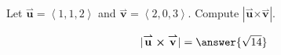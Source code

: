 \documentclass{ximera}
\author{Gregory Hartman \and Matthew Carr}
\begin{document}
\begin{exercise}

Let $\overset{\boldsymbol{\rightharpoonup}}{\mathbf{u}} = \left< 1,1,2\right>$ and $\overset{\boldsymbol{\rightharpoonup}}{\mathbf{v}} = \left< 2,0,3 \right>$. Compute $|\overset{\boldsymbol{\rightharpoonup}}{\mathbf{u}} \boldsymbol\times \overset{\boldsymbol{\rightharpoonup}}{\mathbf{v}}|$.

\begin{prompt}
\[
|\overset{\boldsymbol{\rightharpoonup}}{\mathbf{u}} \boldsymbol\times \overset{\boldsymbol{\rightharpoonup}}{\mathbf{v}}|=\answer{\sqrt{14}}
\]
\end{prompt}


\end{exercise}
\end{document}
